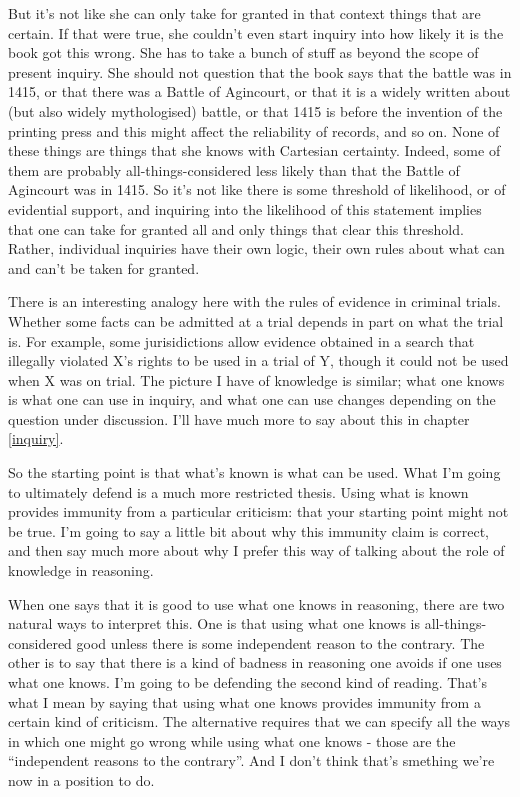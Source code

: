 \documentclass[
  11pt,
]{book}
\begin{document}
But it's not like she can only take for granted in that context things that are certain. If that were true, she couldn't even start inquiry into how likely it is the book got this wrong. She has to take a bunch of stuff as beyond the scope of present inquiry. She should not question that the book says that the battle was in 1415, or that there was a Battle of Agincourt, or that it is a widely written about (but also widely mythologised) battle, or that 1415 is before the invention of the printing press and this might affect the reliability of records, and so on. None of these things are things that she knows with Cartesian certainty. Indeed, some of them are probably all-things-considered less likely than that the Battle of Agincourt was in 1415. So it's not like there is some threshold of likelihood, or of evidential support, and inquiring into the likelihood of this statement implies that one can take for granted all and only things that clear this threshold. Rather, individual inquiries have their own logic, their own rules about what can and can't be taken for granted.

There is an interesting analogy here with the rules of evidence in criminal trials. Whether some facts can be admitted at a trial depends in part on what the trial is. For example, some jurisidictions allow evidence obtained in a search that illegally violated X's rights to be used in a trial of Y, though it could not be used when X was on trial. The picture I have of knowledge is similar; what one knows is what one can use in inquiry, and what one can use changes depending on the question under discussion. I'll have much more to say about this in chapter \ref{inquiry}.

So the starting point is that what's known is what can be used. What I'm going to ultimately defend is a much more restricted thesis. Using what is known provides immunity from a particular criticism: that your starting point might not be true. I'm going to say a little bit about why this immunity claim is correct, and then say much more about why I prefer this way of talking about the role of knowledge in reasoning.

When one says that it is good to use what one knows in reasoning, there are two natural ways to interpret this. One is that using what one knows is all-things-considered good unless there is some independent reason to the contrary. The other is to say that there is a kind of badness in reasoning one avoids if one uses what one knows. I'm going to be defending the second kind of reading. That's what I mean by saying that using what one knows provides immunity from a certain kind of criticism. The alternative requires that we can specify all the ways in which one might go wrong while using what one knows - those are the ``independent reasons to the contrary''. And I don't think that's smething we're now in a position to do.
\end{document}
